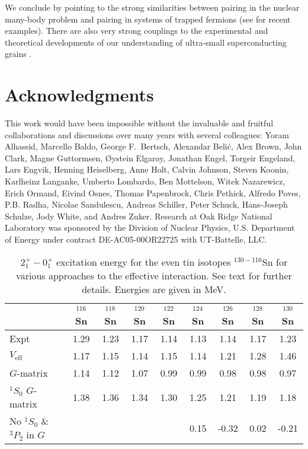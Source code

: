 \documentclass[rmp,preprint,aps,floatfix]{revtex4}
\begin{document}
We conclude by pointing to the strong similarities between pairing in 
the nuclear 
many-body problem and pairing in systems of trapped fermions (see
\cite{henning_ben,bruun2000} for recent examples). 
There are also very strong couplings
to the experimental and theoretical developments of our understanding of
ultra-small superconducting grains 
\cite{tinkham95,tinkham96,tinkham98,delft2000,balian1999,mastellone98,sierra99}.


\section*{Acknowledgments}
This work would have been impossible without the 
invaluable and fruitful
collaborations and discussions over many years with several colleagues: 
Yoram Alhassid, Marcello Baldo, George F.~Bertsch, Alexandar
Beli\'c, Alex Brown, John Clark, 
Magne Guttormsen, \O ystein Elgar\o y, Jonathan Engel, Torgeir Engeland, 
Lars Engvik, Henning Heiselberg, 
Anne Holt, Calvin Johnson, Steven Koonin, 
Karlheinz Langanke, Umberto Lombardo, Ben Mottelson, Witek Nazarewicz, 
Erich Ormand, 
Eivind Osnes, Thomas Papenbrock, Chris Pethick, 
Alfredo Poves, P.B. Radha, Nicolae Sandulescu, Andreas Schiller, 
Peter Schuck, Hans-Joseph Schulze, Jody White, and Andres Zuker.
Research at Oak Ridge National Laboratory was sponsored by the Division
of Nuclear Physics, U.S. Department of Energy under contract DE-AC05-00OR22725 
with UT-Battelle, LLC. 




\newpage


\begin{table}[hbt]
\begin{center}
\caption{ $2^+_1-0^+_1$ excitation energy for the 
even tin isotopes $^{130-116}$Sn for various approaches
to the effective interaction. See text for further details. 
Energies are given in MeV. \label{tab:table_tincalc1}}
\begin{tabular}{lcccccccc}\hline
 & {$^{116}$Sn} & {$^{118}$Sn} & {$^{120}$Sn} &{$^{122}$Sn} & {$^{124}$Sn} & {$^{126}$Sn} & {$^{128}$Sn} & {$^{130}$Sn} \\ \hline
Expt & 1.29 & 1.23 & 1.17 & 1.14 & 1.13 & 1.14 & 1.17 & 1.23 \\
$V_{\mathrm{eff}}$ & 1.17 & 1.15 & 1.14 & 1.15 & 1.14 & 1.21 & 1.28 & 1.46 \\
$G$-matrix &1.14 & 1.12& 1.07 & 0.99 & 0.99 & 0.98 & 0.98 & 0.97  \\
$^1S_0$ $G$-matrix &1.38 &1.36 &1.34 &1.30 & 1.25& 1.21 &1.19 &1.18 \\
No $^1S_0$ \& $^3P_2$ in $G$ &     &     &     &      &0.15 &-0.32 &0.02 &-0.21  \\\hline
\end{tabular}
\end{center}
\end{table}
\end{document}
